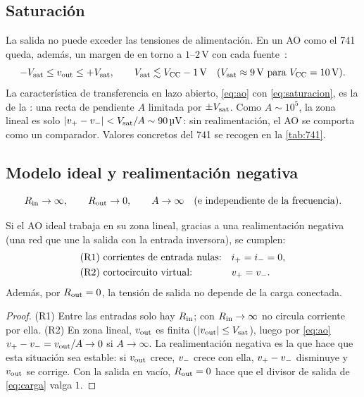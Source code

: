 \subsection{Saturación}\label{sec:saturacion}
La salida no puede exceder las tensiones de alimentación. En un AO como el 741 queda, además,
un margen de en torno a $1$--$2\,\mathrm{V}$ con cada fuente~\cite{UA741}:
\begin{equation}\label{eq:saturacion}
  -\Vsat\le\vout\le+\Vsat,\qquad \Vsat\lesssim\Vcc-1\,\mathrm{V}
  \quad(\Vsat\approx9\,\mathrm{V}\ \text{para}\ \Vcc=10\,\mathrm{V}).
\end{equation}
La característica de transferencia en lazo abierto, \cref{eq:ao} con \cref{eq:saturacion}, es
la de la : una recta de pendiente $A$ limitada por $\pm V_{\mathrm{sat}}$. Como $A\sim10^{5}$,
la zona lineal es solo $\lvert v_{+}-v_{-}\rvert<V_{\mathrm{sat}}/A\sim\SI{90}{\micro\volt}$: sin realimentación, el AO
se comporta como un comparador. Valores concretos del 741 se recogen en la \cref{tab:741}.

\subsection{Modelo ideal y realimentación negativa}\label{sec:ideal}
\begin{hipotesis}\label{hip:ideal}
\begin{equation}\label{eq:ideal}
  R_{\mathrm{in}}\to\infty,\qquad R_{\mathrm{out}}\to0,\qquad A\to\infty\quad(\text{e independiente de la frecuencia}).
\end{equation}
\end{hipotesis}

\begin{proposicion}\label{prop:reglas}
Si el AO ideal trabaja en su zona lineal, gracias a una realimentación negativa (una red que
une la salida con la entrada inversora), se cumplen:
\begin{align}
  &\text{(R1) corrientes de entrada nulas:} && i_{+}=i_{-}=0, \label{eq:R1}\\
  &\text{(R2) cortocircuito virtual:} && v_{+}=v_{-} . \label{eq:R2}
\end{align}
Además, por $R_{\mathrm{out}}=0$, la tensión de salida no depende de la carga conectada.
\end{proposicion}
\begin{proof}
(R1) Entre las entradas solo hay $R_{\mathrm{in}}$; con $R_{\mathrm{in}}\to\infty$ no circula corriente por ella.
(R2) En zona lineal, $v_{\mathrm{out}}$ es finita ($\lvert v_{\mathrm{out}}\rvert\le V_{\mathrm{sat}}$), luego por \cref{eq:ao}
$v_{+}-v_{-}=v_{\mathrm{out}}/A\to0$ si $A\to\infty$. La realimentación negativa es la que hace que esta situación
sea estable: si $v_{\mathrm{out}}$ crece, $v_{-}$ crece con ella, $v_{+}-v_{-}$ disminuye y $v_{\mathrm{out}}$ se corrige.
Con la salida en vacío, $R_{\mathrm{out}}=0$ hace que el divisor de salida de \cref{eq:carga} valga $1$.
\end{proof}

